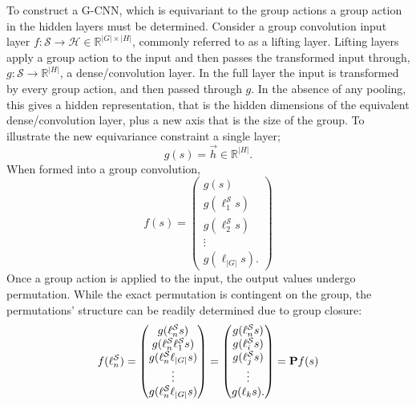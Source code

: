 To construct a G-CNN, which is equivariant to the group actions a group action in the hidden layers must be determined. Consider a group convolution input layer $f : \mathcal{S} \rightarrow \mathcal{H} \in \mathbb{R}^{|G| \times |H|}$, commonly referred to as a lifting layer. Lifting layers apply a group action to the input and then passes the transformed input through, $ g: \mathcal{S} \rightarrow \mathbb{R}^{|H|}$, a dense/convolution layer. In the full layer the input is transformed by every group action, and then passed through $g$. In the absence of any pooling, this gives a hidden representation, that is the hidden dimensions of the equivalent dense/convolution layer, plus a new axis that is the size of the group. To illustrate the new equivariance constraint a single layer;
\begin{equation}
	g(s) = \vec{h} \in \mathbb{R}^{|H|}.
\end{equation}
When formed into a group convolution,
\begin{equation}
	f(s) = \begin{pmatrix}
		g(s)                   \\
		g(\ell_1^\mathcal{S}s) \\
		g(\ell^\mathcal{S}_2s) \\
		\vdots                 \\
		g(\ell_{|G|}s).
	\end{pmatrix}
\end{equation}
Once a group action is applied to the input, the output values undergo permutation. While the exact permutation is contingent on the group, the permutations' structure can be readily determined due to group closure:
\begin{equation}
	f(\ell_n^\mathcal{S}) = \begin{pmatrix}
		g(\ell_n^\mathcal{S}s)                   \\
		g(\ell_n^\mathcal{S}\ell_1^\mathcal{S}s) \\
		g(\ell_n^\mathcal{S}\ell_{|G|}s)         \\
		\vdots                                   \\
		g(\ell_n^\mathcal{S}\ell_{|G|}s)         \\
	\end{pmatrix}
	= \begin{pmatrix}
		g(\ell_n^\mathcal{S}s) \\
		g(\ell_i^\mathcal{S}s) \\
		g(\ell^\mathcal{S}_js) \\
		\vdots                 \\
		g(\ell_{k}s).
	\end{pmatrix}
	= \mathbf{P} f(s)
\end{equation}
